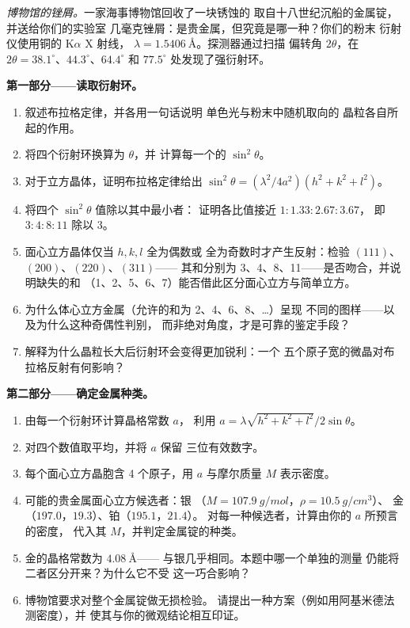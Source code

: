 \begin{problem}\label{pb:b3:crystalline-solids:1}
\emph{博物馆的锉屑。}一家海事博物馆回收了一块锈蚀的
取自十八世纪沉船的金属锭，并送给你们的实验室
几毫克锉屑：是贵金属，但究竟是哪一种？你们的粉末
衍射仪使用铜的 K$\alpha$ X 射线，
$\lambda = \qty{1.5406}{\angstrom}$。探测器通过扫描
偏转角 $2\theta$，在 $2\theta =
38.1^\circ$、$44.3^\circ$、$64.4^\circ$ 和 $77.5^\circ$ 处发现了强衍射环。

\medskip\noindent\textbf{第一部分——读取衍射环。}

\begin{enumerate}
  \item 叙述布拉格定律，并各用一句话说明
        单色光与粉末中随机取向的
        晶粒各自所起的作用。
  \item 将四个衍射环换算为 $\theta$，并
        计算每一个的 $\sin^2\theta$。
  \item 对于立方晶体，证明布拉格定律给出
        $\sin^2\theta = (\lambda^2/4a^2)(h^2 + k^2 + l^2)$。
  \item 将四个 $\sin^2\theta$ 值除以其中最小者：
        证明各比值接近 $1 : 1.33 : 2.67 : 3.67$，
        即 $3 : 4 : 8 : 11$ 除以 3。
  \item 面心立方晶体仅当 $h, k, l$ 全为偶数或
        全为奇数时才产生反射：检验 $(111)$、$(200)$、$(220)$、$(311)$——
        其和分别为 3、4、8、11——是否吻合，并说明缺失的和
        （1、2、5、6、7）能否借此区分面心立方与简单立方。
  \item 为什么体心立方金属（允许的和为 2、4、6、8、\dots）呈现
        不同的图样——以及为什么这种奇偶性判别，
        而非绝对角度，才是可靠的鉴定手段？
  \item 解释为什么晶粒长大后衍射环会变得更加锐利：一个
        五个原子宽的微晶对布拉格反射有何影响？
\end{enumerate}

\medskip\noindent\textbf{第二部分——确定金属种类。}

\begin{enumerate}[resume]
  \item 由每一个衍射环计算晶格常数 $a$，
        利用 $a = \lambda\sqrt{h^2+k^2+l^2}/2\sin\theta$。
  \item 对四个数值取平均，并将 $a$ 保留
        三位有效数字。
  \item 每个面心立方晶胞含 4 个原子，用
        $a$ 与摩尔质量 $M$ 表示密度。
  \item 可能的贵金属面心立方候选者：银
        （$M = \qty{107.9}{g/mol}$，$\rho = \qty{10.5}{g/cm^3}$）、
        金（$197.0$，$19.3$）、铂（$195.1$，$21.4$）。
        对每一种候选者，计算由你的 $a$ 所预言的密度，
        代入其 $M$，并判定金属锭的种类。
  \item 金的晶格常数为 $\qty{4.08}{\angstrom}$——
        与银几乎相同。本题中哪一个单独的测量
        仍能将二者区分开来？为什么它不受
        这一巧合影响？
  \item 博物馆要求对整个金属锭做无损检验。
        请提出一种方案（例如用阿基米德法测密度），并
        使其与你的微观结论相互印证。
\end{enumerate}


\end{problem}
